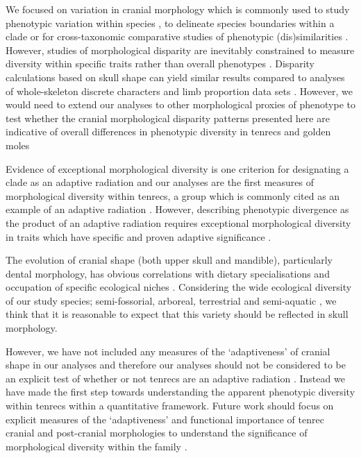 \documentclass[12pt,a4paper]{article}
\begin{document}
	We focused on variation in cranial morphology which is commonly used to study phenotypic variation within species \citep{Blagojevic2011, Bornholdt2008}, to delineate species boundaries within a clade \citep[e.g.][]{Panchetti2008} or for cross-taxonomic comparative studies of phenotypic (dis)similarities \citep[e.g.][]{Ruta2013, Goswami2011, Wroe2007}.
	However, studies of morphological disparity are inevitably constrained to measure diversity within specific traits rather than overall phenotypes \citep{Roy1997}. Disparity calculations based on skull shape can yield similar results compared to analyses of whole-skeleton discrete characters and limb proportion data sets \citep{Foth2012}. However, we would need to extend our analyses to other morphological proxies of phenotype to test whether the cranial morphological disparity patterns presented here are indicative of overall differences in phenotypic diversity in tenrecs and golden moles

 	Evidence of exceptional morphological diversity is one criterion for designating a clade as an adaptive radiation \citep{Losos2010a} and our analyses are the first measures of morphological diversity within tenrecs, a group which is commonly cited as an example of an adaptive radiation \citep{Olson2013}.  However, describing phenotypic divergence as the product of an adaptive radiation requires exceptional morphological diversity in traits which have specific and proven adaptive significance \citep{Losos2010a}. 
 	
 	The evolution of cranial shape (both upper skull and mandible), particularly dental morphology, has obvious correlations with dietary specialisations and occupation of specific ecological niches \citep[e.g.][]{Wroe2007}. Considering the wide ecological diversity of our study species; semi-fossorial, arboreal, terrestrial and semi-aquatic \citep{Soarimalala2011}, we think that it is reasonable to expect that this variety should be reflected in skull morphology.
 	
 	However, we have not included any measures of the `adaptiveness' of cranial shape in our analyses and therefore our analyses should not be considered to be an explicit test of whether or not tenrecs are an adaptive radiation \citep{Losos2010a}. Instead we have made the first step towards understanding the apparent phenotypic diversity within tenrecs within a quantitative framework. Future work should focus on explicit measures of the `adaptiveness' and functional importance of tenrec cranial and post-cranial morphologies to understand the significance of morphological diversity within the family \citep[e.g.][]{Mahler2010}.
 	
\end{document}

